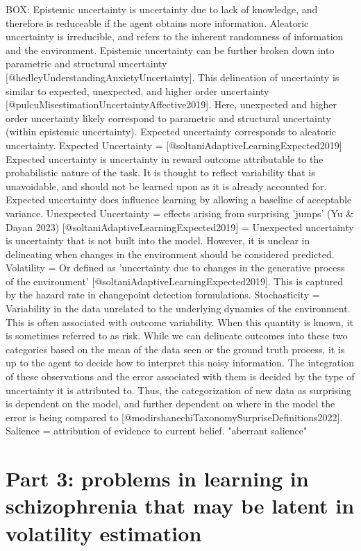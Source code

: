\documentclass{article}
\begin{document}
BOX:
Epistemic uncertainty is uncertainty due to lack of knowledge, and therefore is reduceable if the agent obtains more information. Aleatoric uncertainty is irreducible, and refers to the inherent randomness of information and the environment. Epistemic uncertainty can be further broken down into parametric and structural uncertainty [@hedleyUnderstandingAnxietyUncertainty]. This delineation of uncertainty is similar to expected, unexpected, and higher order uncertainty [@pulcuMisestimationUncertaintyAffective2019]. Here, unexpected and higher order uncertainty likely correspond to parametric and structural uncertainty (within epistemic uncertainty). Expected uncertainty corresponds to aleatoric uncertainty.
Expected Uncertainty = [@soltaniAdaptiveLearningExpected2019] Expected uncertainty is uncertainty in reward outcome attributable to the probabilistic nature of the task. It is thought to reflect variability that is unavoidable, and should not be learned upon as it is already accounted for. Expected uncertainty does influence learning by allowing a baseline of acceptable variance.
Unexpected Uncertainty = effects arising from surprising 'jumps' (Yu & Dayan 2023)
[@soltaniAdaptiveLearningExpected2019] = Unexpected uncertainty is uncertainty that is not built into the model. However, it is unclear in delineating when changes in the environment should be considered predicted.
Volatility = Or defined as 'uncertainty due to changes in the generative process of the environment' [@soltaniAdaptiveLearningExpected2019]. This is captured by the hazard rate in changepoint detection formulations.
Stochasticity = Variability in the data unrelated to the underlying dynamics of the environment. This is often associated with outcome variability. When this quantity is known, it is sometimes referred to as risk.
While we can delineate outcomes into these two categories based on the mean of the data seen or the ground truth process, it is up to the agent to decide how to interpret this noisy information. The integration of these observations and the error associated with them is decided by the type of uncertainty it is attributed to. Thus, the categorization of new data as surprising is dependent on the model, and further dependent on where in the model the error is being compared to [@modirshanechiTaxonomySurpriseDefinitions2022].
Salience = attribution of evidence to current belief. "aberrant salience"

\section{Part 3: problems in learning in schizophrenia that may be latent in volatility estimation}\label{problems_learning}
\end{document}
